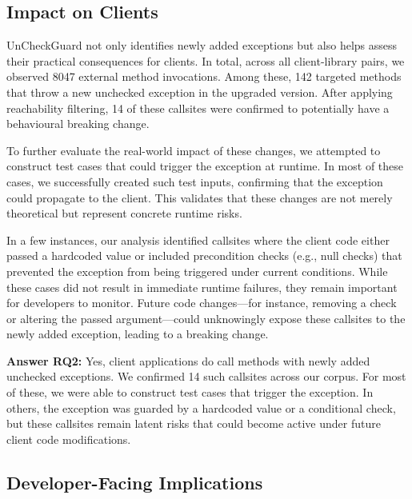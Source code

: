 \subsection{Impact on Clients}

UnCheckGuard not only identifies newly added exceptions but also helps assess their practical consequences for clients. In total, across all client-library pairs, we observed 8047 external method invocations. Among these, 142 targeted methods that throw a new unchecked exception in the upgraded version. After applying reachability filtering, 14 of these callsites were confirmed to potentially have a behavioural breaking change. 

To further evaluate the real-world impact of these changes, we attempted to construct test cases that could trigger the exception at runtime. In most of these cases, we successfully created such test inputs, confirming that the exception could propagate to the client. This validates that these changes are not merely theoretical but represent concrete runtime risks.

In a few instances, our analysis identified callsites where the client code either passed a hardcoded value or included precondition checks (e.g., null checks) that prevented the exception from being triggered under current conditions. While these cases did not result in immediate runtime failures, they remain important for developers to monitor. Future code changes—for instance, removing a check or altering the passed argument—could unknowingly expose these callsites to the newly added exception, leading to a breaking change.

\vspace{1em}
\begin{tcolorbox}[colback=gray!10, colframe=black]
\textbf{Answer RQ2:} Yes, client applications do call methods with newly added unchecked exceptions. We confirmed 14 such callsites across our corpus. For most of these, we were able to construct test cases that trigger the exception. In others, the exception was guarded by a hardcoded value or a conditional check, but these callsites remain latent risks that could become active under future client code modifications.
\end{tcolorbox}
\vspace{1em}

\subsection{Developer-Facing Implications}

